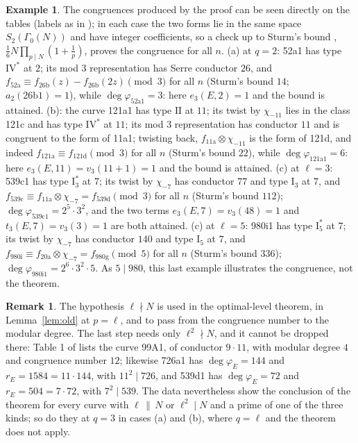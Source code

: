 \documentclass[11pt]{amsart}
\theoremstyle{definition}
\newtheorem{remark}[theorem]{Remark}
\newtheorem{example}[theorem]{Example}
\newcommand{\degphi}{\deg\varphi_E}
\begin{document}
\begin{example}\label{ex:qual}
The congruences produced by the proof can be seen directly on the tables (labels as in \cite{Cremona97}); in each case the two forms lie in the same space $S_2(\Gamma_0(N))$ and have integer coefficients, so a check up to Sturm's bound \cite{Sturm87}, $\frac16N\prod_{p\mid N}(1+\frac1p)$, proves the congruence for all $n$. (a) at $q=2$: 52a1 has type $\mathrm{IV}^*$ at $2$; its mod $3$ representation has Serre conductor $26$, and $f_{\text{52a}}\equiv f_{\text{26b}}(z)-f_{\text{26b}}(2z)\pmod 3$ for all $n$ (Sturm's bound $14$; $a_2(\text{26b1})=1$), while $\deg\varphi_{\text{52a1}}=3$: here $e_3(E,2)=1$ and the bound is attained. (b): the curve 121a1 has type $\mathrm{II}$ at $11$; its twist by $\chi_{-11}$ lies in the class 121c and has type $\mathrm{IV}^*$ at $11$; its mod $3$ representation has conductor $11$ and is congruent to the form of 11a1; twisting back, $f_{\text{11a}}\otimes\chi_{-11}$ is the form of 121d, and indeed $f_{\text{121a}}\equiv f_{\text{121d}}\pmod 3$ for all $n$ (Sturm's bound $22$), while $\deg\varphi_{\text{121a1}}=6$: here $e_3(E,11)=v_3(11+1)=1$ and the bound is attained. (c) at $\ell=3$: 539c1 has type $\mathrm{I}_3^*$ at $7$; its twist by $\chi_{-7}$ has conductor $77$ and type $\mathrm{I}_3$ at $7$, and $f_{\text{539c}}\equiv f_{\text{11a}}\otimes\chi_{-7}=f_{\text{539d}}\pmod3$ for all $n$ (Sturm's bound $112$); $\deg\varphi_{\text{539c1}}=2^5\cdot3^2$, and the two terms $e_3(E,7)=v_3(48)=1$ and $t_3(E,7)=v_3(3)=1$ are both attained. (c) at $\ell=5$: 980i1 has type $\mathrm{I}_5^*$ at $7$; its twist by $\chi_{-7}$ has conductor $140$ and type $\mathrm{I}_5$ at $7$, and $f_{\text{980i}}\equiv f_{\text{20a}}\otimes\chi_{-7}=f_{\text{980g}}\pmod5$ for all $n$ (Sturm's bound $336$); $\deg\varphi_{\text{980i1}}=2^6\cdot3^2\cdot5$. As $5\mid980$, this last example illustrates the congruence, not the theorem.
\end{example}

\begin{remark}
The hypothesis $\ell\nmid N$ is used in the optimal-level theorem, in Lemma~\ref{lem:old} at $p=\ell$, and to pass from the congruence number to the modular degree. The last step needs only $\ell^2\nmid N$, and it cannot be dropped there: Table 1 of \cite{ARS12} lists the curve 99A1, of conductor $9\cdot11$, with modular degree $4$ and congruence number $12$; likewise 726a1 has $\degphi=144$ and $r_E=1584=11\cdot144$, with $11^2\mid726$, and 539d1 has $\degphi=72$ and $r_E=504=7\cdot72$, with $7^2\mid539$. The data nevertheless show the conclusion of the theorem for every curve with $\ell\,\|\,N$ or $\ell^2\mid N$ and a prime of one of the three kinds; so do they at $q=3$ in cases (a) and (b), where $q=\ell$ and the theorem does not apply.
\end{remark}
\end{document}

